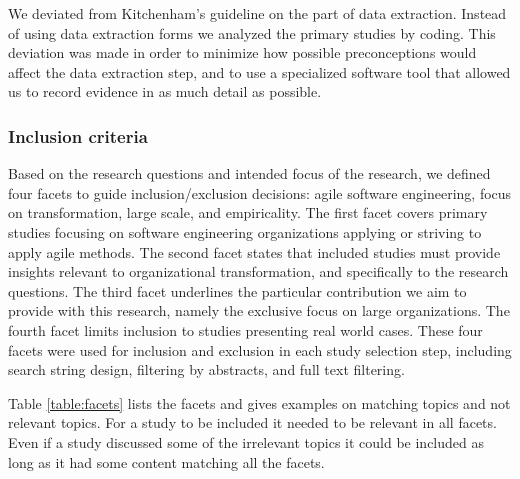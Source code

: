 We deviated from Kitchenham's guideline on the part of data extraction. Instead
of using data extraction forms we analyzed the primary studies by coding. This
deviation was made in order to minimize how possible preconceptions would affect
the data extraction step, and to use a specialized software tool that allowed us
to record evidence in as much detail as possible.

\subsubsection{Inclusion criteria}
\label{sec:inclusioncriteria}

Based on the research questions and intended focus of the research, we defined
four facets to guide inclusion/exclusion decisions: agile software engineering,
focus on transformation, large scale, and empiricality. The first facet covers
primary studies focusing on software engineering organizations applying or
striving to apply agile methods. The second facet states that included studies
must provide insights relevant to organizational transformation, and
specifically to the research questions. The third facet underlines the
particular contribution we aim to provide with this research, namely the
exclusive focus on large organizations. The fourth facet limits inclusion to
studies presenting real world cases. These four facets were used for inclusion
and exclusion in each study selection step, including search string design,
filtering by abstracts, and full text filtering.

Table \ref{table:facets} lists the facets and gives examples on matching topics
and not relevant topics. For a study to be included it needed to be relevant
in all facets. Even if a study discussed some of the irrelevant topics it could
be included as long as it had some content matching all the facets.

